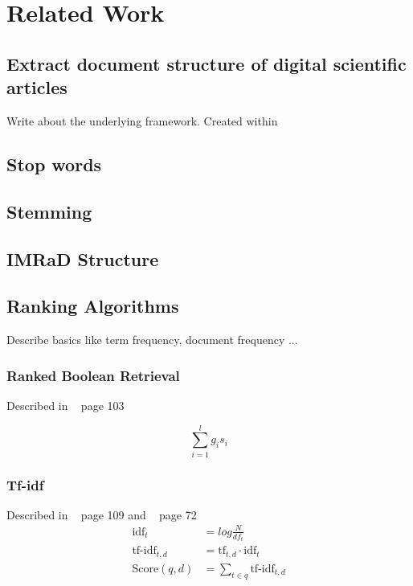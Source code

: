 \chapter{Related Work}
\label{cha:related_work}

\section{Extract document structure of digital scientific articles}
\label{sec:extract_document_structure}

Write about the underlying framework. Created within ~\cite{KlampflGJK14}

\section{Stop words}
\label{sec:stop_words}

\section{Stemming}
\label{sec:stemming}

\section{IMRaD Structure}
\label{sec:imrad_structure}

\section{Ranking Algorithms}
\label{sec:ranking_algorithms}

Describe basics like term frequency, document frequency ...

\subsection{Ranked Boolean Retrieval}
\label{sec:ranked_boolean_retrieval}

Described in ~\cite{manning2008} page 103

\begin{equation}
  \sum_{i = 1}^{l}g_i s_i
\end{equation}

\subsection{Tf-idf}
\label{sec:tfidf}

Described in ~\cite{manning2008} page 109 and ~\cite{ModernInvormationRetrieval1999} page 72
\begin{equation}
  \begin{split}
    \text{idf}_t & = log \frac{N}{df_t} \\
    \text{tf-idf}_{t, d} & = \text{tf}_{t, d} \cdot \text{idf}_t \\
    \text{Score}(q, d) & = \sum_{t \in q}\text{tf-idf}_{t, d}
  \end{split}
\end{equation}

